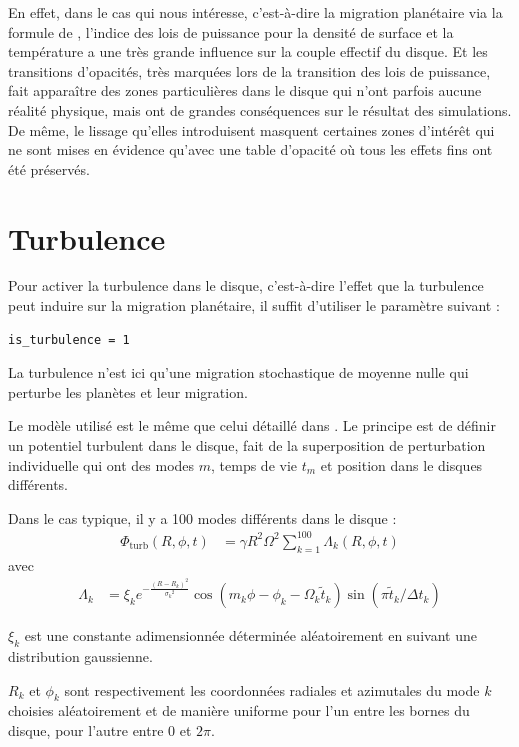 En effet, dans le cas qui nous intéresse, c'est-à-dire la migration planétaire via la formule de \citep{paardekooper2011torque}, l'indice des lois de puissance pour la densité de surface et la température a une très grande influence sur la couple effectif du disque. Et les transitions d'opacités, très marquées lors de la transition des lois de puissance, fait apparaître des zones particulières dans le disque qui n'ont parfois aucune réalité physique, mais ont de grandes conséquences sur le résultat des simulations. De même, le lissage qu'elles introduisent masquent certaines zones d'intérêt qui ne sont mises en évidence qu'avec une table d'opacité où tous les effets fins ont été préservés.

\section{Turbulence}
Pour activer la turbulence dans le disque, c'est-à-dire l'effet que la turbulence peut induire sur la migration planétaire, il suffit d'utiliser le paramètre suivant : 
\begin{verbatim}
is_turbulence = 1
\end{verbatim}

La turbulence n'est ici qu'une migration stochastique de moyenne nulle qui perturbe les planètes et leur migration. 

Le modèle utilisé est le même que celui détaillé dans \cite{ogihara2007accretion}. Le principe est de définir un potentiel turbulent dans le disque, fait de la superposition de perturbation individuelle qui ont des modes $m$, temps de vie $t_m$ et position dans le disques différents. 

Dans le cas typique, il y a 100 modes différents dans le disque : 
\begin{align}
\Phi_\text{turb}(R,\phi,t) &= \gamma R^2 \Omega^2 \sum_{k=1}^{100} \Lambda_k(R,\phi,t)
\end{align}
avec 
\begin{align}
\Lambda_k &= \xi_k e^{-\frac{(R-R_k)^2}{{\sigma_k}^2}} \cos\left(m_k \phi -\phi_k - \Omega_k\tilde{t}_k\right) \sin\left(\pi \tilde{t}_k/\Delta t_k\right)
\end{align}

$\xi_k$ est une constante adimensionnée déterminée aléatoirement en suivant une distribution gaussienne.

$R_k$ et $\phi_k$ sont respectivement les coordonnées radiales et azimutales du mode $k$ choisies aléatoirement et de manière uniforme pour l'un entre les bornes du disque, pour l'autre entre $0$ et $2\pi$. 


